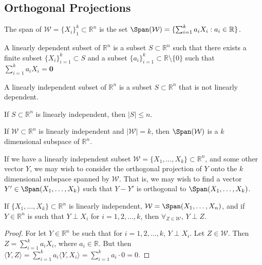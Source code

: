 \documentclass[crop=false,class=book,oneside]{standalone}
\begin{document}
        \subsection{Orthogonal Projections}
        \begin{definition}
        The span of $\mathcal{W}=\{X_{i}\}_{1}^{k} \subset \mathbb{R}^n$ is the set $\Span(\mathcal{W})=\{\sum_{i=1}^{k} a_i X_i: a_i \in \mathbb{R}\}$.
        \end{definition}
        \begin{definition}
        A linearly dependent subset of $\mathbb{R}^{n}$ is a subset $S\subset\mathbb{R}^{n}$ such that there exists a finite subset $\{X_{i}\}_{i=1}^{k}\subset S$ and a subset $\{a_{i}\}_{i=1}^{k}\subset \mathbb{R}\setminus \{0\}$ such that $\sum_{i=1}^{k}a_{i}X_{i}=\mathbf{0}$
        \end{definition}
        \begin{definition}
        A linearly independent subset of $\mathbb{R}^{n}$ is a subset $S\subset \mathbb{R}^{n}$ that is not linearly dependent.
        \end{definition}
        \begin{theorem}
        If $S\subset\mathbb{R}^{n}$ is linearly independent, then $|S|\leq n$.
        \end{theorem}
        \begin{theorem}
        If $\mathcal{W}\subset\mathbb{R}^{n}$ is linearly independent and $|\mathcal{W}| = k$, then $\Span(\mathcal{W})$ is a $k$ dimensional subspace of $\mathbb{R}^n$.
        \end{theorem}
        If we have a linearly independent subset $\mathcal{W}=\{X_1,\hdots, X_k\}\subset\mathbb{R}^n$, and some other vector $Y$, we may wish to consider the orthogonal projection of $Y$ onto the $k$ dimensional subspace spanned by $\mathcal{W}$. That is, we may wish to find a vector $Y'\in\Span(X_1,\hdots, X_k)$ such that $Y-Y'$ is orthogonal to $\Span(X_1,\hdots, X_k)$.
        \begin{theorem}
        If $\{X_1,\hdots, X_k\}\subset\mathbb{R}^n$ is linearly independent, $\mathcal{W} = \Span(X_1,\hdots, X_n)$, and if $Y\in \mathbb{R}^n$ is such that $Y\perp X_i$ for $i=1,2,\hdots, k$, then $\forall_{Z\in \mathcal{W}}$, $Y\perp Z$.
        \end{theorem}
        \begin{proof}
        For let $Y\in \mathbb{R}^n$ be such that for $i=1,2,\hdots, k$, $Y\perp X_i$. Let $Z\in \mathcal{W}$. Then $Z= \sum_{i=1}^{k} a_i X_i$, where $a_i\in \mathbb{R}$. But then $\langle Y, Z\rangle = \sum_{i=1}^{k} a_i \langle Y, X_i\rangle = \sum_{i=1}^{k} a_i\cdot 0 = 0$. 
        \end{proof}
\end{document}
